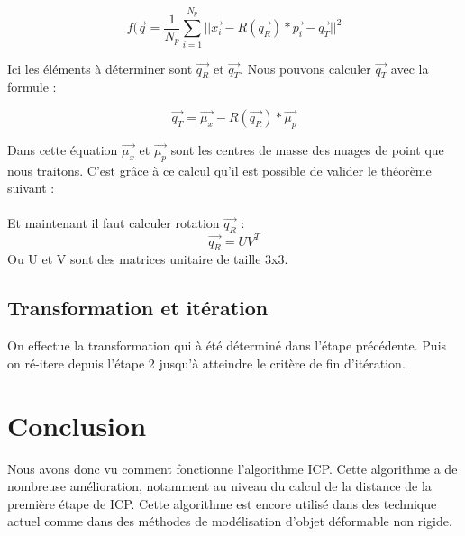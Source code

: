 \documentclass[a4paper,10pt]{article}
\begin{document}
\begin{equation} 
 f(\vec{q} = \frac{1}{N_p}\sum_{i=1}^{N_p}||\vec{x_i} - R(\vec{q_R}) * \vec{p_i} - \vec{q_T}||^2
\end{equation}

Ici les éléments à déterminer sont $\vec{q_R}$ et $\vec{q_T}$. Nous pouvons calculer $\vec{q_T}$ avec la formule :

\begin{equation} 
 \vec{q_T} = \vec{\mu_x} - R(\vec{q_R})*\vec{\mu_p}
\end{equation}

Dans cette équation $\vec{\mu_x}$ et $\vec{\mu_p}$ sont les centres de masse des
nuages de point que nous traitons. C'est grâce à ce calcul qu'il est possible de
valider le théorème suivant : \\

\\

Et maintenant il faut calculer rotation $\vec{q_R}$ :
\begin{equation} 
 \vec{q_R} = UV^T
\end{equation} 
Ou U et V sont des matrices unitaire de taille 3x3.
\subsection{Transformation et itération}
 On effectue la transformation qui à été déterminé dans l'étape précédente.
 Puis on ré-itere depuis l'étape 2 jusqu'à atteindre le critère de fin d'itération.

\section{Conclusion}
Nous avons donc vu comment fonctionne l'algorithme ICP. Cette algorithme a de nombreuse amélioration, notamment au niveau du calcul de la distance de la première étape de ICP.
Cette algorithme est encore utilisé dans des technique actuel comme dans des méthodes
de modélisation d'objet déformable non rigide.
\end{document}
